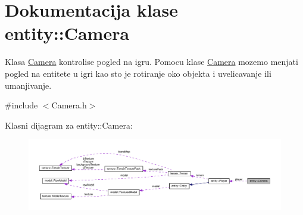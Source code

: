 \hypertarget{classentity_1_1Camera}{}\section{Dokumentacija klase entity\+:\+:Camera}
\label{classentity_1_1Camera}


Klasa \hyperlink{classentity_1_1Camera}{Camera} kontrolise pogled na igru. Pomocu klase \hyperlink{classentity_1_1Camera}{Camera} mozemo menjati pogled na entitete u igri kao sto je rotiranje oko objekta i uvelicavanje ili umanjivanje.  




{\ttfamily \#include $<$Camera.\+h$>$}



Klasni dijagram za entity\+:\+:Camera\+:\nopagebreak
\begin{figure}[H]
\begin{center}
\leavevmode
\includegraphics[width=350pt]{classentity_1_1Camera__coll__graph}
\end{center}
\end{figure}

